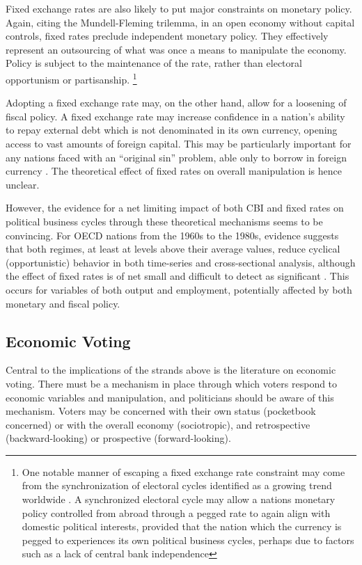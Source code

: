 \documentclass{article}
\begin{document}
    Fixed exchange rates are also likely to put major constraints on monetary policy. Again, citing the Mundell-Fleming trilemma, in an open economy without capital controls, fixed rates preclude independent monetary policy. They effectively represent an outsourcing of what was once a means to manipulate the economy. Policy is subject to the maintenance of the rate, rather than electoral opportunism or partisanship. \footnote{One notable manner of escaping a fixed exchange rate constraint may come from the synchronization of electoral cycles identified as a growing trend worldwide \citep{tufte_political_1980}. A synchronized electoral cycle may allow a nations monetary policy controlled from abroad through a pegged rate to again align with domestic political interests, provided that the nation which the currency is pegged to experiences its own political business cycles, perhaps due to factors such as a lack of central bank independence}
    
    Adopting a fixed exchange rate may, on the other hand, allow for a loosening of fiscal policy. A fixed exchange rate may increase confidence in a nation’s ability to repay external debt which is not denominated in its own currency, opening access to vast amounts of foreign capital. This may be particularly important for any nations faced with an “original sin” problem, able only to borrow in foreign currency \citep{eichengreen_other_2005}. The theoretical effect of fixed rates on overall manipulation is hence unclear.
    
    However, the evidence for a net limiting impact of both CBI and fixed rates on political business cycles through these theoretical mechanisms seems to be convincing. For OECD nations from the 1960s to the 1980s, evidence suggests that both regimes, at least at levels above their average values, reduce cyclical (opportunistic) behavior in both time-series and cross-sectional analysis, although the effect of fixed rates is of net small and difficult to detect as significant \citep{clark_international_1998}. This occurs for variables of both output and employment, potentially affected by both monetary and fiscal policy.

    \subsection*{Economic Voting}

    Central to the implications of the strands above is the literature on economic voting. There must be a mechanism in place through which voters respond to economic variables and manipulation, and politicians should be aware of this mechanism. Voters may be concerned with their own status (pocketbook concerned) or with the overall economy (sociotropic), and retrospective (backward-looking) or prospective (forward-looking).
\end{document}
